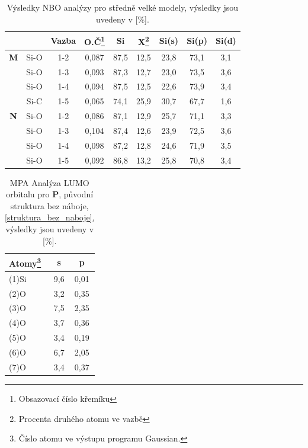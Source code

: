 \documentclass[
  digital, %
  table,   %
  lof,     %
  lot,     %
  oneside,
]{fithesis3}
\begin{document}
\begin{table}[htbp]
  \begin{minipage}{\textwidth}
\caption{Výsledky NBO analýzy pro středně velké modely, výsledky jsou uvedeny v [\%].}
\begin{tabular}{|c|c|c|c|c|c|c|c|c|}
  \hline
  \label{nbo_small} &  & Vazba & O.Č\footnote{Obsazovací číslo křemíku} & Si & X\footnote{Procenta druhého atomu ve  vazbě} & Si(s) & Si(p) &Si(d) \\ \hline
\textbf{M} & Si-O & 1-2 & 0,087 & 87,5  & 12,5  & 23,8  & 73,1  & 3,1  \\ \hline
 & Si-O & 1-3 & 0,093 & 87,3  & 12,7  & 23,0  & 73,5  & 3,6  \\ \hline
 & Si-O & 1-4 & 0,094 & 87,5  & 12,5  & 22,6  & 73,9  & 3,4  \\ \hline
 & Si-C & 1-5 & 0,065 & 74,1  & 25,9  & 30,7  & 67,7  & 1,6  \\ \hline
\textbf{N} & Si-O & 1-2 & 0,086 & 87,1  & 12,9  & 25,7  & 71,1  & 3,3  \\ \hline
 & Si-O & 1-3 & 0,104 & 87,4  & 12,6  & 23,9  & 72,5  & 3,6  \\ \hline
 & Si-O & 1-4 & 0,098 & 87,2  & 12,8  & 24,6  & 71,9  & 3,5  \\ \hline
 & Si-O & 1-5 & 0,092 & 86,8  & 13,2  & 25,8  & 70,8  & 3,4  \\ \hline
\end{tabular}
\end{minipage}
\end{table}




\begin{table}[htbp] \begin{minipage}{\textwidth}
\caption{MPA Analýza LUMO orbitalu pro \textbf{P}, původní struktura bez náboje, \ref{struktura_bez_naboje}, výsledky jsou uvedeny v [\%].}
\begin{center}
\begin{tabular}{|l|c|c|}
\hline
 \label{struktura_bez_naboje_MPA}Atomy\footnote{Číslo atomu ve výstupu programu Gaussian.}& s & p\\ \hline
(1)Si & 9,6  & 0,01   \\ \hline
(2)O & 3,2  & 0,35   \\ \hline
(3)O & 7,5  & 2,35   \\ \hline
(4)O & 3,7  & 0,36   \\ \hline
(5)O & 3,4  & 0,19   \\ \hline
(6)O & 6,7  & 2,05   \\ \hline
(7)O & 3,4  & 0,37   \\ \hline
\end{tabular}
\end{center}\end{minipage}
\end{table}
\end{document}
